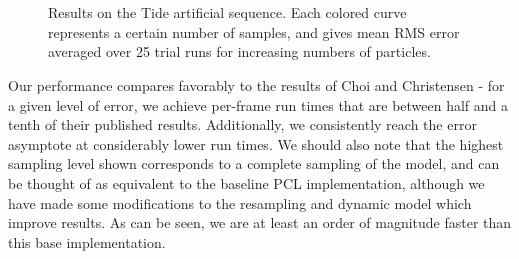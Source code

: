 \begin{figure}[!ht]
  \centering 
  \vspace{-10pt}
   \\
  \vspace{-10pt}
     \vspace{-7pt} \\
  \caption[Results on the Tide artificial sequence.]{Results on the Tide artificial sequence. Each colored curve represents a certain number of samples, and gives mean RMS error averaged over 25 trial runs for increasing numbers of particles.}%
  \label{fig:ErrorPlotsTide}%
\end{figure}

Our performance compares favorably to the results of Choi and Christensen \cite{Choi_IROS2013} - for a given level of error, we achieve per-frame run times that are between half and a tenth of their published results. Additionally, we consistently reach the error asymptote at considerably lower run times. We should also note that the highest sampling level shown corresponds to a complete sampling of the model, and can be thought of as equivalent to the baseline PCL implementation, although we have made some modifications to the resampling and dynamic model which improve results. As can be seen, we are at least an order of magnitude faster than this base implementation.

